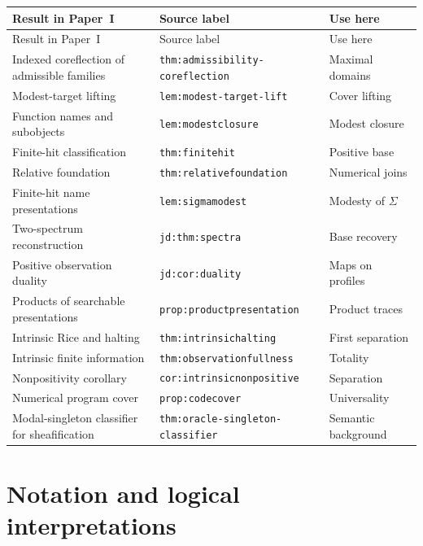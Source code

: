 \documentclass[11pt,a4paper]{article}
\numberwithin{equation}{section}
\theoremstyle{definition}
\theoremstyle{remark}
\theoremstyle{plain}
\begin{document}
\begingroup\small
\begin{longtable}{L{.32\linewidth}L{.40\linewidth}L{.19\linewidth}}
\toprule
Result in Paper~I & Source label & Use here\\
\midrule
\endfirsthead
\toprule
Result in Paper~I & Source label & Use here\\
\midrule
\endhead
\bottomrule
\endfoot
Indexed coreflection of admissible families &
\texttt{thm:admissibility-coreflection} & Maximal domains\\
Modest-target lifting & \texttt{lem:modest-target-lift} & Cover lifting\\
Function names and subobjects & \texttt{lem:modestclosure} & Modest closure\\
Finite-hit classification & \texttt{thm:finitehit} & Positive base\\
Relative foundation & \texttt{thm:relativefoundation} & Numerical joins\\
Finite-hit name presentations & \texttt{lem:sigmamodest} & Modesty of $\Sigma$\\
Two-spectrum reconstruction & \texttt{jd:thm:spectra} & Base recovery\\
Positive observation duality & \texttt{jd:cor:duality} & Maps on profiles\\
Products of searchable presentations & \texttt{prop:productpresentation} & Product traces\\
Intrinsic Rice and halting & \texttt{thm:intrinsichalting} & First separation\\
Intrinsic finite information & \texttt{thm:observationfullness} & Totality\\
Nonpositivity corollary & \texttt{cor:intrinsicnonpositive} & Separation\\
Numerical program cover & \texttt{prop:codecover} & Universality\\
Modal-singleton classifier for sheafification &
\texttt{thm:oracle-singleton-classifier} & Semantic background\\
\end{longtable}
\endgroup

\section{Notation and logical interpretations}
\label{app:notation}
\end{document}
